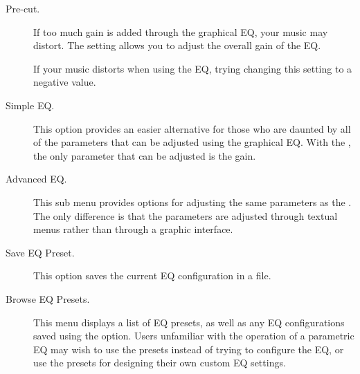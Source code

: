 {\begin {description}
  \item[Pre-cut.]
  If too much gain is added through the graphical EQ, your music may distort.
  The  setting allows you to adjust the overall gain of the EQ.

  If your music distorts when using the EQ, trying changing this setting to a 
  negative value.

\item[Simple EQ.]
This option provides an easier alternative for those who are daunted by all of
the parameters that can be adjusted using the graphical EQ. With the
, the only parameter that can be adjusted is the gain.

\item[Advanced EQ.]
This sub menu provides options for adjusting the same parameters as the
. The only difference is that the parameters are
adjusted through textual menus rather than through a graphic interface.

\item[Save EQ Preset.]
This option saves the current EQ configuration in a  file.

\item[Browse EQ Presets.]
This menu displays a list of EQ presets, as well as any EQ configurations saved
using the  option. Users unfamiliar with the
operation of a parametric EQ may wish to use the presets instead of trying to
configure the EQ, or use the presets for designing their own custom EQ
settings.

\end{description}
}

